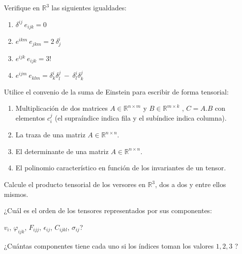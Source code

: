 \begin{exercise}

\item
Verifique en $\mathbb{R}^3$ las siguientes igualdades:
\begin{enumerate}
\item
$\delta^{ij}~e_{ijk}=0$

\item
$e^{ikm}~e_{jkm}=2~ \delta ^i_j$
\item
$e^{ijk}~e_{ijk}=3!$

\item
$e^{ijm}~e_{klm}=\delta ^i_k \delta ^j_l~ - ~ \delta ^i_l\delta
^j_k$

\bigskip

\end{enumerate}
\end{exercise}
\begin{exercise}

\item


Utilice el convenio de la suma de Einstein para escribir de forma tensorial:

\bigskip


\begin{enumerate}

\item
Multiplicación de dos matrices $A\in \mathbb{R}^{n\times m}$ y $B\in \mathbb{R}^{m\times k}$ , $C=A.B$ con elementos $c^j_i$ (el supraíndice indica fila y el subíndice indica columna).
\item
La traza de una matriz  $A\in \mathbb{R}^{n \times n}$. 
\item
El determinante de una matriz  $A\in \mathbb{R}^{n \times n}$. 
\item 
El polinomio característico en función de los invariantes de un tensor.
\end{enumerate}
\end{exercise}

\bigskip


\begin{exercise}
\item
Calcule el producto tensorial de los versores en $\mathbb{R}^{3}$, dos a dos y entre ellos mismos.
\end{exercise}
\begin{exercise}
\item
¿Cuál es el orden de los tensores representados por sus componentes: 

\bigskip

$v_i$, $\varphi_{ijk}$,
$F_{ijj}$, $\epsilon_{ij}$, $C_{ijkl}$, $\sigma_{ij}$? 

\bigskip

\noindent
¿Cuántas componentes tiene cada uno si los índices toman los valores $1,2,3$ ?
\end{exercise}

